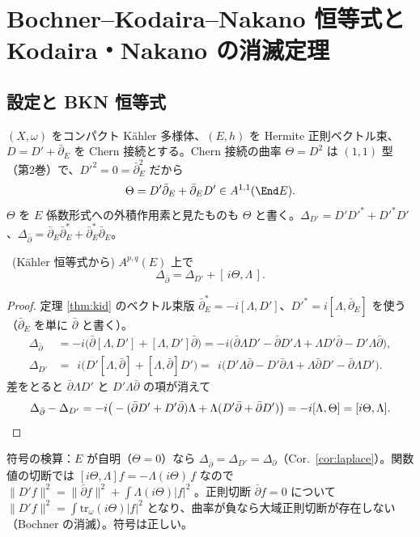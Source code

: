 
\section{Bochner--Kodaira--Nakano 恒等式と Kodaira・Nakano の消滅定理}\label{sec:bkn}

\subsection{設定と BKN 恒等式}
$(X,\omega)$ をコンパクト Kähler 多様体、$(E,h)$ を Hermite 正則ベクトル束、$D=D'+\bar\partial_E$ を Chern 接続とする。Chern 接続の曲率 $\Theta=D^2$ は $(1,1)$ 型（第2巻）で、$D'^2=0=\bar\partial_E^2$ だから
\[
\Theta=D'\bar\partial_E+\bar\partial_ED'\in A^{1,1}(\End E).
\]
$\Theta$ を $E$ 係数形式への外積作用素と見たものも $\Theta$ と書く。$\Delta_{D'}=D'D'^*+D'^*D'$、$\Delta_{\bar\partial}=\bar\partial_E\bar\partial_E^*+\bar\partial_E^*\bar\partial_E$。
\begin{thm}\label{thm:BKN}\tP\ (Kähler 恒等式から)
$A^{p,q}(E)$ 上で
\[
\Delta_{\bar\partial}=\Delta_{D'}+[\,i\Theta,\Lambda\,] .
\]
\end{thm}
\begin{proof}
定理 \ref{thm:kid} のベクトル束版 $\bar\partial_E^*=-i[\Lambda,D']$、$D'^*=i[\Lambda,\bar\partial_E]$ を使う（$\bar\partial_E$ を単に $\bar\partial$ と書く）。
\begin{align*}
\Delta_{\bar\partial}&=-i\big(\bar\partial[\Lambda,D']+[\Lambda,D']\bar\partial\big)=-i\big(\bar\partial\Lambda D'-\bar\partial D'\Lambda+\Lambda D'\bar\partial-D'\Lambda\bar\partial\big),\\
\Delta_{D'}&=\ \ i\big(D'[\Lambda,\bar\partial]+[\Lambda,\bar\partial]D'\big)=\ \ i\big(D'\Lambda\bar\partial-D'\bar\partial\Lambda+\Lambda\bar\partial D'-\bar\partial\Lambda D'\big).
\end{align*}
差をとると $\bar\partial\Lambda D'$ と $D'\Lambda\bar\partial$ の項が消えて
\[
\Delta_{\bar\partial}-\Delta_{D'}=-i\big(-(\bar\partial D'+D'\bar\partial)\Lambda+\Lambda(D'\bar\partial+\bar\partial D')\big)=-i[\Lambda,\Theta]=[i\Theta,\Lambda].\qedhere
\]
\end{proof}
符号の検算：$E$ が自明（$\Theta=0$）なら $\Delta_{\bar\partial}=\Delta_{D'}=\Delta_\partial$（Cor.\ \ref{cor:laplace}）。関数値の切断では $[i\Theta,\Lambda]f=-\Lambda(i\Theta)\,f$ なので $\|D'f\|^2=\|\bar\partial f\|^2+\int\Lambda(i\Theta)|f|^2$ 。正則切断 $\bar\partial f=0$ について $\|D'f\|^2=\int\mathrm{tr}_\omega(i\Theta)|f|^2$ となり、曲率が負なら大域正則切断が存在しない（Bochner の消滅）。符号は正しい。

